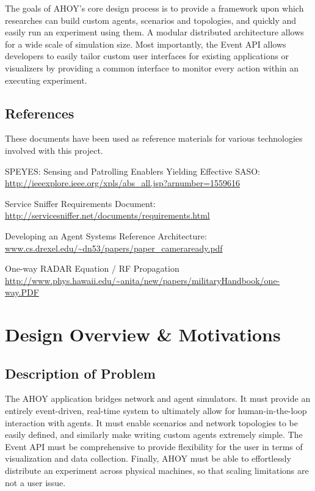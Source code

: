 \documentclass[titlepage]{article}
\renewenvironment{itemize*}
    {\begin{itemize}
        \setlength{\itemsep}{0pt}%
        \setlength{\parskip}{0pt}%
        \setlength{\partopsep}{0pt}%
        \setlength{\topsep}{0pt}}%
    {\end{itemize}}
\begin{document}
The goals of AHOY's core design process is to provide a framework upon which researches can build custom agents, scenarios and topologies, and quickly and easily run an experiment using them. A modular distributed architecture allows for a wide scale of simulation size. Most importantly, the Event API allows developers to easily tailor custom user interfaces for existing applications or visualizers by providing a common interface to monitor every action within an executing experiment.

\subsection{References%
  \label{references}%
}

These documents have been used as reference materials for various technologies involved with this project.
%
\begin{itemize*}
	\item SPEYES: Sensing and Patrolling Enablers Yielding Effective SASO: \url{http://ieeexplore.ieee.org/xpls/abs_all.jsp?arnumber=1559616}
	\item Service Sniffer Requirements Document: \url{http://servicesniffer.net/documents/requirements.html}
    \item Developing an Agent Systems Reference Architecture: \url{www.cs.drexel.edu/~dn53/papers/paper_cameraready.pdf}
    \item One-way RADAR Equation / RF Propagation \url{http://www.phys.hawaii.edu/~anita/new/papers/militaryHandbook/one-way.PDF}
\end{itemize*}

\section{Design Overview \& Motivations}
\subsection{Description of Problem}
The AHOY application bridges network and agent simulators. It must provide an entirely event-driven, real-time system to ultimately allow for human-in-the-loop interaction with agents. It must enable scenarios and network topologies to be easily defined, and similarly make writing custom agents extremely simple. The Event API must be comprehensive to provide flexibility for the user in terms of visualization and data collection. Finally, AHOY must be able to effortlessly distribute an experiment across physical machines, so that scaling limitations are not a user issue.
\end{document}
